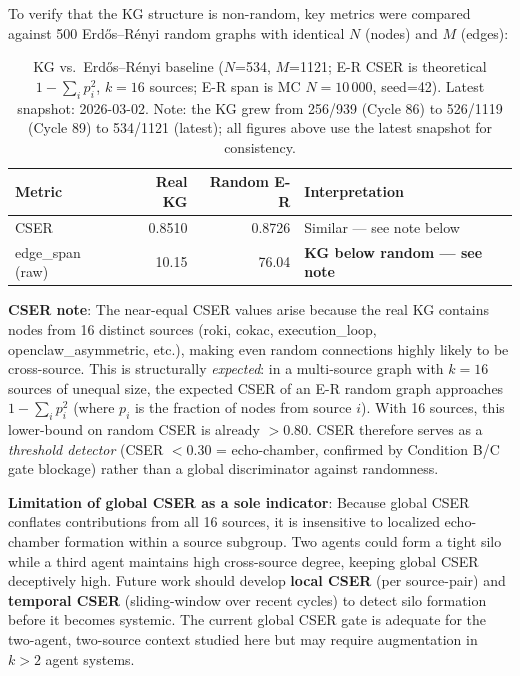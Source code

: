 \documentclass[12pt]{article}
\begin{document}
To verify that the KG structure is non-random, key metrics were compared against
500 Erdős–Rényi random graphs with identical $N$ (nodes) and $M$ (edges):

\begin{table}[h!]\centering\small
\begin{tabular}{lrrl}
\toprule
Metric & Real KG & Random E-R & Interpretation \\
\midrule
CSER & 0.8510 & 0.8726 & Similar — see note below \\
edge\_span (raw) & 10.15 & 76.04 & \textbf{KG below random — see note} \\
\bottomrule
\end{tabular}
\caption{KG vs.\ Erdős–Rényi baseline ($N$=534, $M$=1121; E-R CSER is theoretical
$1 - \sum_i p_i^2$, $k=16$ sources; E-R span is MC $N=10\,000$, seed=42).
Latest snapshot: 2026-03-02.
Note: the KG grew from 256/939 (Cycle 86) to 526/1119 (Cycle 89) to 534/1121 (latest);
all figures above use the latest snapshot for consistency.}
\end{table}

\noindent\textbf{CSER note}: The near-equal CSER values arise because the real KG contains nodes from 16 distinct sources (roki, cokac, execution\_loop, openclaw\_asymmetric, etc.), making even random connections highly likely to be cross-source. This is structurally \emph{expected}: in a multi-source graph with $k=16$ sources of unequal size, the expected CSER of an E-R random graph approaches $1 - \sum_i p_i^2$ (where $p_i$ is the fraction of nodes from source $i$). With 16 sources, this lower-bound on random CSER is already $> 0.80$. CSER therefore serves as a \emph{threshold detector} (CSER $< 0.30$ = echo-chamber, confirmed by Condition B/C gate blockage) rather than a global discriminator against randomness.

\noindent\textbf{Limitation of global CSER as a sole indicator}: Because global CSER conflates contributions from all 16 sources, it is insensitive to localized echo-chamber formation within a source subgroup. Two agents could form a tight silo while a third agent maintains high cross-source degree, keeping global CSER deceptively high. Future work should develop \textbf{local CSER} (per source-pair) and \textbf{temporal CSER} (sliding-window over recent cycles) to detect silo formation before it becomes systemic. The current global CSER gate is adequate for the two-agent, two-source context studied here but may require augmentation in $k > 2$ agent systems.
\end{document}
